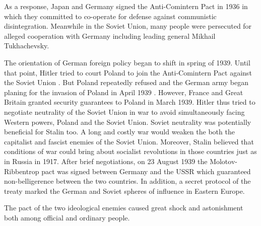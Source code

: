 As a response, Japan and Germany signed the Anti-Comintern Pact in 1936 in which they committed to  co-operate for defense against communistic disintegration. 
Meanwhile in the Soviet Union, many people were persecuted for alleged cooperation with Germany including leading general Mikhail Tukhachevsky. 

The orientation of German foreign policy began to shift in spring of 1939.
Until that point, Hitler tried to court Poland to join the Anti-Comintern Pact against the Soviet Union \citep[chapter 26]{weinberg_hitlers_2010}. 
But Poland repeatedly refused and the German army began planing for the invasion of Poland in April 1939 \citep[p. 621]{kotkin_stalin:_2017}. However, France and Great Britain granted security guarantees to Poland in March 1939. 
Hitler thus tried to negotiate neutrality of the Soviet Union in war to avoid simultaneously facing  Western powers, Poland and the Soviet Union.
Soviet neutrality was potentially beneficial for Stalin too. A long and 
costly war would weaken the both the capitalist and fascist enemies of the 
Soviet Union. Moreover, Stalin believed that conditions of war could bring 
about socialist revolutions in those countries just as in Russia in 1917.  
After brief negotiations, on 23 August 1939   the  Molotov-Ribbentrop pact 
was signed between Germany and the USSR which guaranteed non-belligerence 
between the two countries. In addition,  a secret protocol of the treaty marked the German and Soviet spheres of influence in Eastern Europe.

The pact of the two ideological enemies caused great shock and astonishment both among official and ordinary people. 




